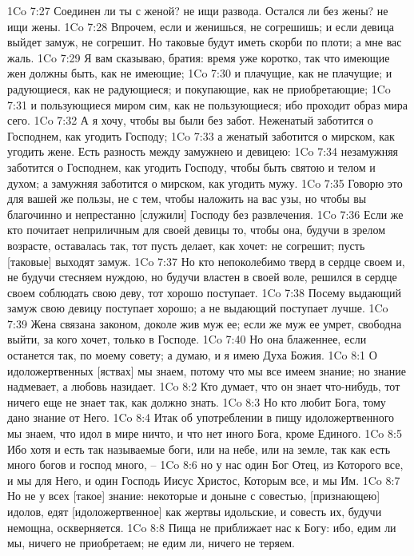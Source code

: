 1Co 7:27  Соединен ли ты с женой? не ищи развода. Остался ли без жены? не ищи жены.
1Co 7:28  Впрочем, если и женишься, не согрешишь; и если девица выйдет замуж, не согрешит. Но таковые будут иметь скорби по плоти; а мне вас жаль.
1Co 7:29  Я вам сказываю, братия: время уже коротко, так что имеющие жен должны быть, как не имеющие;
1Co 7:30  и плачущие, как не плачущие; и радующиеся, как не радующиеся; и покупающие, как не приобретающие;
1Co 7:31  и пользующиеся миром сим, как не пользующиеся; ибо проходит образ мира сего.
1Co 7:32  А я хочу, чтобы вы были без забот. Неженатый заботится о Господнем, как угодить Господу;
1Co 7:33  а женатый заботится о мирском, как угодить жене. Есть разность между замужнею и девицею:
1Co 7:34  незамужняя заботится о Господнем, как угодить Господу, чтобы быть святою и телом и духом; а замужняя заботится о мирском, как угодить мужу.
1Co 7:35  Говорю это для вашей же пользы, не с тем, чтобы наложить на вас узы, но чтобы вы благочинно и непрестанно [служили] Господу без развлечения.
1Co 7:36  Если же кто почитает неприличным для своей девицы то, чтобы она, будучи в зрелом возрасте, оставалась так, тот пусть делает, как хочет: не согрешит; пусть [таковые] выходят замуж.
1Co 7:37  Но кто непоколебимо тверд в сердце своем и, не будучи стесняем нуждою, но будучи властен в своей воле, решился в сердце своем соблюдать свою деву, тот хорошо поступает.
1Co 7:38  Посему выдающий замуж свою девицу поступает хорошо; а не выдающий поступает лучше.
1Co 7:39  Жена связана законом, доколе жив муж ее; если же муж ее умрет, свободна выйти, за кого хочет, только в Господе.
1Co 7:40  Но она блаженнее, если останется так, по моему совету; а думаю, и я имею Духа Божия.
1Co 8:1  О идоложертвенных [яствах] мы знаем, потому что мы все имеем знание; но знание надмевает, а любовь назидает.
1Co 8:2  Кто думает, что он знает что-нибудь, тот ничего еще не знает так, как должно знать.
1Co 8:3  Но кто любит Бога, тому дано знание от Него.
1Co 8:4  Итак об употреблении в пищу идоложертвенного мы знаем, что идол в мире ничто, и что нет иного Бога, кроме Единого.
1Co 8:5  Ибо хотя и есть так называемые боги, или на небе, или на земле, так как есть много богов и господ много, --
1Co 8:6  но у нас один Бог Отец, из Которого все, и мы для Него, и один Господь Иисус Христос, Которым все, и мы Им.
1Co 8:7  Но не у всех [такое] знание: некоторые и доныне с совестью, [признающею] идолов, едят [идоложертвенное] как жертвы идольские, и совесть их, будучи немощна, оскверняется.
1Co 8:8  Пища не приближает нас к Богу: ибо, едим ли мы, ничего не приобретаем; не едим ли, ничего не теряем.
